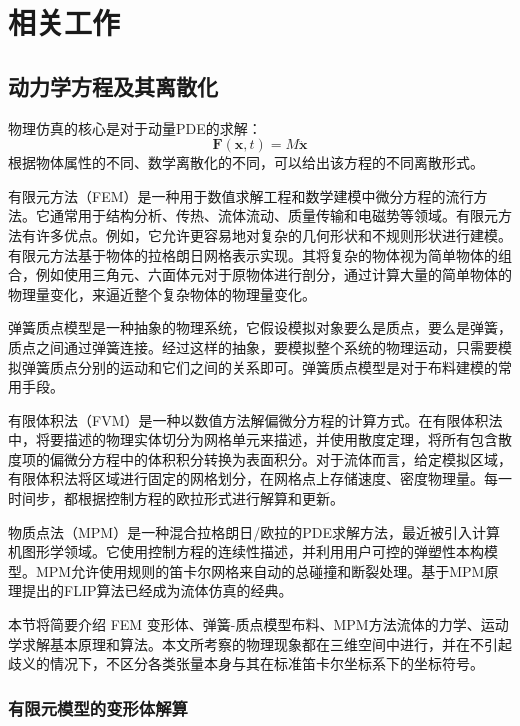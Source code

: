 \chapter{相关工作}\label{chap:rel-works}

\section{动力学方程及其离散化}

物理仿真的核心是对于动量PDE的求解：
\begin{equation}
\mathbf F(\mathbf x, t) = M \ddot{\mathbf x}  
\end{equation}
根据物体属性的不同、数学离散化的不同，可以给出该方程的不同离散形式。

有限元方法（FEM）是一种用于数值求解工程和数学建模中微分方程的流行方法。它通常用于结构分析、传热、流体流动、质量传输和电磁势等领域。有限元方法有许多优点。例如，它允许更容易地对复杂的几何形状和不规则形状进行建模。有限元方法基于物体的拉格朗日网格表示实现。其将复杂的物体视为简单物体的组合，例如使用三角元、六面体元对于原物体进行剖分，通过计算大量的简单物体的物理量变化，来逼近整个复杂物体的物理量变化。

弹簧质点模型是一种抽象的物理系统，它假设模拟对象要么是质点，要么是弹簧，质点之间通过弹簧连接。经过这样的抽象，要模拟整个系统的物理运动，只需要模拟弹簧质点分别的运动和它们之间的关系即可。弹簧质点模型是对于布料建模的常用手段。

有限体积法（FVM）是一种以数值方法解偏微分方程的计算方式。在有限体积法中，将要描述的物理实体切分为网格单元来描述，并使用散度定理，将所有包含散度项的偏微分方程中的体积积分转换为表面积分。对于流体而言，给定模拟区域，有限体积法将区域进行固定的网格划分，在网格点上存储速度、密度物理量。每一时间步，都根据控制方程的欧拉形式进行解算和更新。

物质点法（MPM）是一种混合拉格朗日/欧拉的PDE求解方法，最近被引入计算机图形学领域。它使用控制方程的连续性描述，并利用用户可控的弹塑性本构模型。MPM允许使用规则的笛卡尔网格来自动的总碰撞和断裂处理。基于MPM原理提出的FLIP算法已经成为流体仿真的经典。

本节将简要介绍 FEM 变形体、弹簧-质点模型布料、MPM方法流体的力学、运动学求解基本原理和算法。本文所考察的物理现象都在三维空间中进行，并在不引起歧义的情况下，不区分各类张量本身与其在标准笛卡尔坐标系下的坐标符号。


\subsection{有限元模型的变形体解算}\label{sec:dyn-solve}

